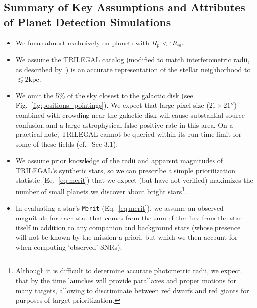 \subsection{Summary of Key Assumptions and Attributes of Planet Detection 
Simulations}
\label{sec:input_assumptions}
\begin{itemize}
  
	\item We focus almost exclusively on planets with $R_p < 4R_\oplus$.

        \item We assume the TRILEGAL catalog (modified to match
          interferometric radii, as described
          by~) is an accurate representation
          of the stellar neighborhood to $\lesssim2\text{kpc}$.

        \item We omit the 5\% of the sky closest to the galactic disk
          (see Fig.~\ref{fig:positions_pointings}). We expect that
          \tesss large pixel size ($21\times21''$) combined with
          crowding near the galactic disk will cause substantial
          source confusion and a large astrophysical false positive
          rate in this area.  On a practical note, TRILEGAL cannot be
          queried within its run-time limit for some of these fields
          (cf.~ Sec 3.1).
        
	\item We assume prior knowledge of the radii and apparent
          magnitudes of TRILEGAL's synthetic stars, so we can
          prescribe a simple prioritization statistic
          (Eq.~\ref{eq:merit}) that we expect (but have not verified)
          maximizes the number of small planets we discover about
          bright stars\footnote{Although it is difficult to determine
            accurate photometric radii, we expect that by the time
            \tess launches \gaia will provide parallaxes and proper
            motions for many \tess targets, allowing \tess to
            discriminate between red dwarfs and red giants for
            purposes of target prioritization.}.
          
	\item In evaluating a star's \texttt{Merit}
          (Eq.~\ref{eq:merit}), we assume an observed magnitude for
          each star that comes from the sum of the flux from the star
          itself in addition to any companion and background stars
          (whose presence will not be known by the mission a priori,
          but which we then account for when computing `observed'
          SNRs).
          

\end{itemize}
